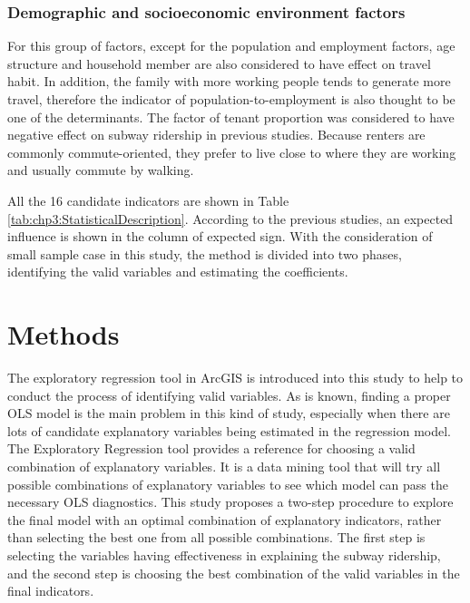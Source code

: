 %
\subsubsection{Demographic and socioeconomic environment factors}
%
For this group of factors, except for the population and employment factors, age structure and household member are also considered to have effect on travel habit. In addition, the family with more working people tends to generate more travel, therefore the indicator of population-to-employment is also thought to be one of the determinants. The factor of tenant proportion was considered to have negative effect on subway ridership in previous studies. Because renters are commonly commute-oriented, they prefer to live close to where they are working and usually commute by walking.

%
All the 16 candidate indicators are shown in Table \ref{tab:chp3:StatisticalDescription}. According to the previous studies, an expected influence is shown in the column of expected sign. With the consideration of small sample case in this study, the method is divided into two phases, identifying the valid variables and estimating the coefficients.

%
\section{Methods}
%
The exploratory regression tool in ArcGIS is introduced into this study to help to conduct the process of identifying valid variables. As is known, finding a proper OLS model is the main problem in this kind of study, especially when there are lots of candidate explanatory variables being estimated in the regression model. The Exploratory Regression tool provides a reference for choosing a valid combination of explanatory variables. It is a data mining tool that will try all possible combinations of explanatory variables to see which model can pass the necessary OLS diagnostics. This study proposes a two-step procedure to explore the final model with an optimal combination of explanatory indicators, rather than selecting the best one from all possible combinations. The first step is selecting the variables having effectiveness in explaining the subway ridership, and the second step is choosing the best combination of the valid variables in the final indicators.

